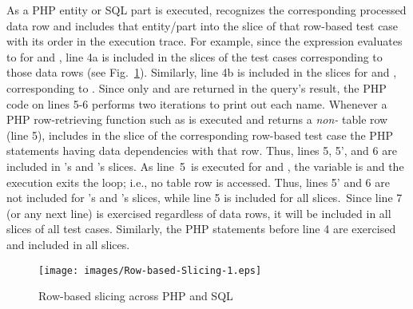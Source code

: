 As a PHP entity or SQL part is executed, \tool{} recognizes the
corresponding processed data row and includes that entity/part into
the slice of that row-based test case with its order in the execution
trace. For example, since the  expression evaluates to
 for  and , line 4a is included in
the slices of the test cases corresponding to those data rows
(see Fig.~\ref{fig:Rowbased-Slicing}). Similarly, line 4b is included in
the slices for  and , corresponding to
. Since only  and 
are returned in the query's result, the PHP code on lines 5-6 performs
two iterations to print out each name. Whenever a PHP row-retrieving
function such as  is executed and returns a
\emph{non-} table row (line 5), \tool{} includes 
in the slice of the corresponding row-based test case the PHP
statements having data dependencies with that row. Thus, lines 5, 5',
and 6 are included in 's and 's slices.
As line~5~is executed for  and
, the variable  is  and the
execution exits the  loop; i.e., no table row is accessed.
Thus, lines 5' and 6 are not included for 's and
's slices, while line 5 is included for all slices.~Since 
line 7 (or any next line) is exercised regardless of
data rows, it will be included in all slices of all test cases.
Similarly, the PHP statements before line 4 are exercised and included
in all slices.


\begin{figure}[t]
  \centering
  \texttt{[image: images/Row-based-Slicing-1.eps]}\\ %
  \caption{Row-based slicing across PHP and SQL}\label{fig:Rowbased-Slicing}
\end{figure}

